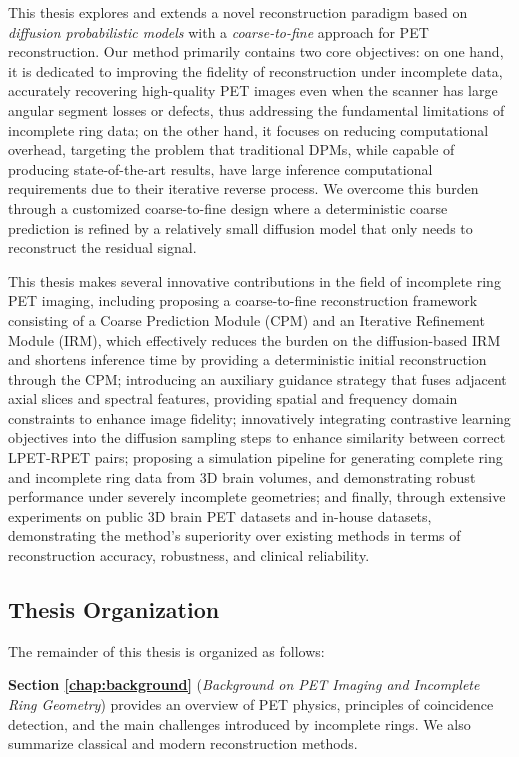 \documentclass[
reprint,
superscriptaddress,
nofootinbib,
amsmath,amssymb,
aps,
prd,
]{revtex4-2}
\begin{document}
This thesis explores and extends a novel reconstruction paradigm based on \emph{diffusion probabilistic models} with a \emph{coarse-to-fine} approach for PET reconstruction. Our method primarily contains two core objectives: on one hand, it is dedicated to improving the fidelity of reconstruction under incomplete data, accurately recovering high-quality PET images even when the scanner has large angular segment losses or defects, thus addressing the fundamental limitations of incomplete ring data; on the other hand, it focuses on reducing computational overhead, targeting the problem that traditional DPMs, while capable of producing state-of-the-art results, have large inference computational requirements due to their iterative reverse process. We overcome this burden through a customized coarse-to-fine design where a deterministic coarse prediction is refined by a relatively small diffusion model that only needs to reconstruct the residual signal.

This thesis makes several innovative contributions in the field of incomplete ring PET imaging, including proposing a coarse-to-fine reconstruction framework consisting of a Coarse Prediction Module (CPM) and an Iterative Refinement Module (IRM), which effectively reduces the burden on the diffusion-based IRM and shortens inference time by providing a deterministic initial reconstruction through the CPM; introducing an auxiliary guidance strategy that fuses adjacent axial slices and spectral features, providing spatial and frequency domain constraints to enhance image fidelity; innovatively integrating contrastive learning objectives into the diffusion sampling steps to enhance similarity between correct LPET-RPET pairs; proposing a simulation pipeline for generating complete ring and incomplete ring data from 3D brain volumes, and demonstrating robust performance under severely incomplete geometries; and finally, through extensive experiments on public 3D brain PET datasets and in-house datasets, demonstrating the method's superiority over existing methods in terms of reconstruction accuracy, robustness, and clinical reliability.

\subsection{Thesis Organization}
The remainder of this thesis is organized as follows:

\textbf{Section \ref{chap:background}} (\emph{Background on PET Imaging and Incomplete Ring Geometry}) provides an overview of PET physics, principles of coincidence detection, and the main challenges introduced by incomplete rings. We also summarize classical and modern reconstruction methods.
\end{document}
